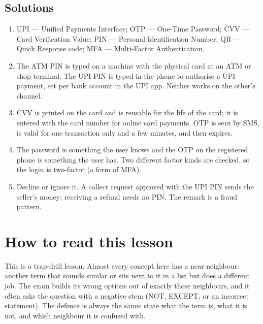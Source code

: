 \subsection*{Solutions}
\begingroup\small
\begin{enumerate}[label=\arabic*.]
  \item UPI --- Unified Payments Interface; OTP --- One-Time Password; CVV
    --- Card Verification Value; PIN --- Personal Identification Number; QR
    --- Quick Response code; MFA --- Multi-Factor Authentication.
  \item The ATM PIN is typed on a machine with the physical card at an ATM
    or shop terminal. The UPI PIN is typed in the phone to authorise a UPI
    payment, set per bank account in the UPI app. Neither works on the
    other's channel.
  \item CVV is printed on the card and is reusable for the life of the card;
    it is entered with the card number for online card payments. OTP is sent
    by SMS, is valid for one transaction only and a few minutes, and then
    expires.
  \item The password is something the user knows and the OTP on the
    registered phone is something the user has. Two different factor kinds
    are checked, so the login is two-factor (a form of MFA).
  \item Decline or ignore it. A collect request approved with the UPI PIN
    sends the seller's money; receiving a refund needs no PIN. The remark is
    a fraud pattern.
\end{enumerate}
\endgroup

\section{How to read this lesson}
This is a trap-drill lesson. Almost every concept here has a near-neighbour:
another term that sounds similar or sits next to it in a list but does a
different job. The exam builds its wrong options out of exactly those
neighbours, and it often asks the question with a negative stem (NOT, EXCEPT,
or an incorrect statement). The defence is always the same: state what the
term is, what it is not, and which neighbour it is confused with.

